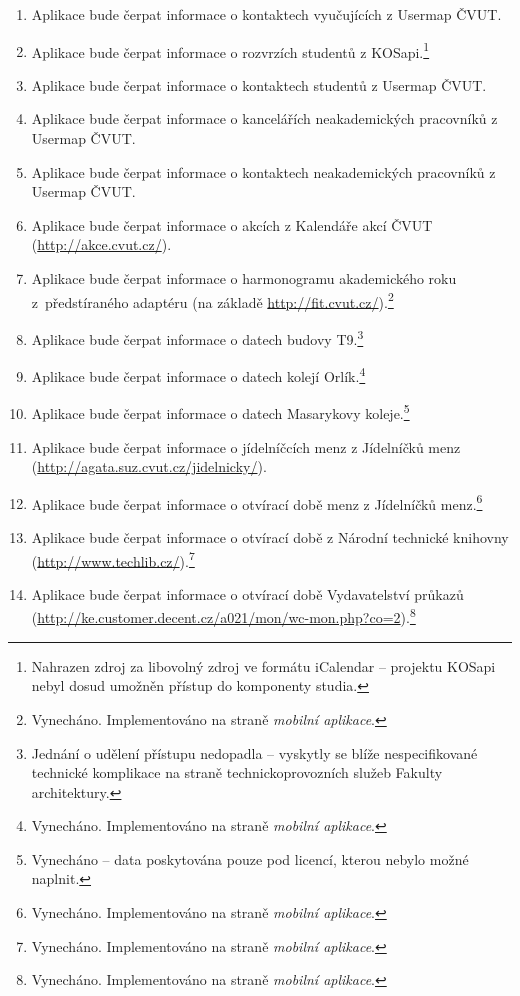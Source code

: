 \begin{enumerate}
 \item Aplikace bude čerpat informace o kontaktech vyučujících z Usermap ČVUT.
 \item Aplikace bude čerpat informace o rozvrzích studentů z KOSapi.\footnote{Nahrazen zdroj za libovolný zdroj ve formátu iCalendar -- projektu KOSapi nebyl dosud umožněn přístup do komponenty studia.}
 \item Aplikace bude čerpat informace o kontaktech studentů z Usermap ČVUT.
 \item Aplikace bude čerpat informace o kancelářích neakademických pracovníků z Usermap ČVUT.
 \item Aplikace bude čerpat informace o kontaktech neakademických pracovníků z Usermap ČVUT.
 \item Aplikace bude čerpat informace o akcích  z Kalendáře akcí ČVUT (\url{http://akce.cvut.cz/}).
 \item Aplikace bude čerpat informace o harmonogramu akademického roku z~předstíraného adaptéru (na základě \url{http://fit.cvut.cz/}).\footnote{Vynecháno. Implementováno na straně \textit{mobilní aplikace}.}
 \item Aplikace bude čerpat informace o datech  budovy T9.\footnote{Jednání o udělení přístupu nedopadla -- vyskytly se blíže nespecifikované technické komplikace na straně technickoprovozních služeb Fakulty architektury.}
 \item Aplikace bude čerpat informace o datech  kolejí Orlík.\footnote{Vynecháno. Implementováno na straně \textit{mobilní aplikace}.}
 \item Aplikace bude čerpat informace o datech  Masarykovy koleje.\footnote{Vynecháno -- data poskytována pouze pod licencí, kterou nebylo možné naplnit.}
 \item Aplikace bude čerpat informace o jídelníčcích menz z Jídelníčků menz (\url{http://agata.suz.cvut.cz/jidelnicky/}).
 \item Aplikace bude čerpat informace o otvírací době menz z Jídelníčků menz.\footnote{Vynecháno. Implementováno na straně \textit{mobilní aplikace}.}
 \item Aplikace bude čerpat informace o otvírací době  z Národní technické knihovny (\url{http://www.techlib.cz/}).\footnote{Vynecháno. Implementováno na straně \textit{mobilní aplikace}.}
 \item Aplikace bude čerpat informace o otvírací době Vydavatelství průkazů (\url{http://ke.customer.decent.cz/a021/mon/wc-mon.php?co=2}).\footnote{Vynecháno. Implementováno na straně \textit{mobilní aplikace}.}

\end{enumerate}

